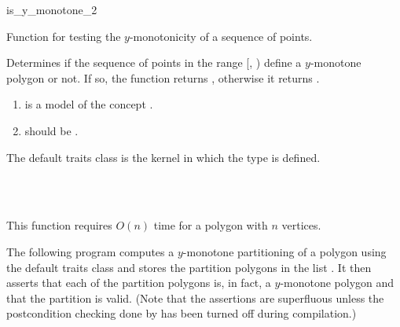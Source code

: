 \begin{ccRefFunction}{is_y_monotone_2}

\ccDefinition

Function for testing the $y$-monotonicity of a sequence of points.


{
Determines if the sequence of points in the range 
[, ) define a $y$-monotone 
polygon or not. If so, the function returns , otherwise it
returns . 
}

\begin{enumerate}
    \item {} is a model of the concept .%
    \item {} should be .
\end{enumerate}

The default traits class  is the kernel in which the
type  is defined.%

\ccSeeAlso
{} \\
 \\

\ccImplementation

This function requires $O(n)$ time for a polygon with $n$ vertices.

\ccExample

The following program computes a $y$-monotone partitioning
of a polygon using the default
traits class and stores the partition polygons in the list 
.  It then asserts that each of the partition 
polygons is, in fact, a $y$-monotone polygon and that the partition
is valid.  (Note that the
assertions are superfluous unless the postcondition checking done
by  has been turned off during compilation.)




\end{ccRefFunction}
